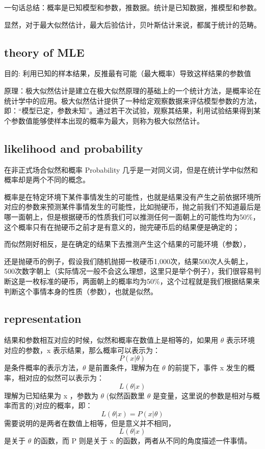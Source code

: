 \documentclass[12pt]{ctexart}%
\begin{document}
			
			一句话总结：概率是已知模型和参数，推数据。统计是已知数据，推模型和参数。 
			
			
			显然，对于最大似然估计，最大后验估计，贝叶斯估计来说，都属于统计的范畴。
		
		\subsection{theory of MLE}
			目的: 利用已知的样本结果，反推最有可能（最大概率）导致这样结果的参数值
			
			 原理：极大似然估计是建立在极大似然原理的基础上的一个统计方法，是概率论在统计学中的应用。极大似然估计提供了一种给定观察数据来评估模型参数的方法，即：“模型已定，参数未知”。通过若干次试验，观察其结果，利用试验结果得到某个参数值能够使样本出现的概率为最大，则称为极大似然估计。
			 
		\subsection{\quad likelihood and probability}
			在非正式场合似然和概率 Probability 几乎是一对同义词，但是在统计学中似然和概率却是两个不同的概念。
			
			概率是在特定环境下某件事情发生的可能性，也就是结果没有产生之前依据环境所对应的参数来预测某件事情发生的可能性，比如抛硬币，抛之前我们不知道最后是哪一面朝上，但是根据硬币的性质我们可以推测任何一面朝上的可能性均为50\%，这个概率只有在抛硬币之前才是有意义的，抛完硬币后的结果便是确定的；
			
			而似然刚好相反，是在确定的结果下去推测产生这个结果的可能环境（参数），
			
			还是抛硬币的例子，假设我们随机抛掷一枚硬币1,000次，结果500次人头朝上，500次数字朝上（实际情况一般不会这么理想，这里只是举个例子），我们很容易判断这是一枚标准的硬币，两面朝上的概率均为50\%，这个过程就是我们根据结果来判断这个事情本身的性质（参数），也就是似然。
			
		\subsection{\quad representation}
			结果和参数相互对应的时候，似然和概率在数值上是相等的，如果用 $\theta$ 表示环境对应的参数，x 表示结果，那么概率可以表示为：
				$$P(x|\theta)$$
			是条件概率的表示方法，$\theta$ 是前置条件，理解为在 $\theta$ 的前提下，事件 x 发生的概率，相对应的似然可以表示为：
				$$L(\theta|x)$$
			理解为已知结果为 x ，参数为 $\theta$ (似然函数里 $\theta$  是变量，这里说的参数是相对与概率而言的)对应的概率，即：
			$$L(\theta|x) = P(x|\theta)$$
			需要说明的是两者在数值上相等，但是意义并不相同，$$L(\theta|x)$$ 是关于 $\theta$ 的函数，而 P 则是关于 x 的函数，两者从不同的角度描述一件事情。
			
\end{document}
